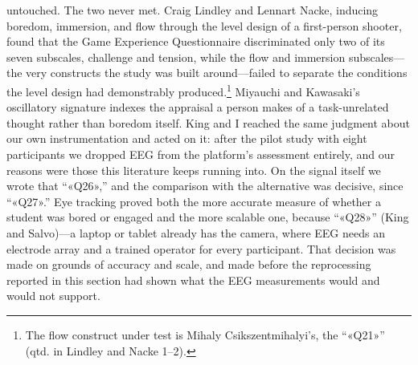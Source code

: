 untouched. The two never met. Craig Lindley and Lennart Nacke, inducing boredom,
immersion, and flow through the level design of a first-person shooter, found that the Game
Experience Questionnaire discriminated only two of its seven subscales, challenge and tension,
while the flow and immersion subscales---the very constructs the study was built
around---failed to separate the conditions the level design had demonstrably
produced.\footnote{The flow construct under test is Mihaly Csikszentmihalyi's, the ``«Q21»''
(qtd. in Lindley and Nacke 1--2).} Miyauchi and Kawasaki's oscillatory signature indexes the
appraisal a person makes of a task-unrelated thought rather than boredom itself. King and I
reached the same judgment about our own instrumentation and acted on it: after the pilot study
with eight participants we dropped EEG from the platform's assessment entirely, and our
reasons were those this literature keeps running into. On the signal itself we wrote that
``«Q26»,'' and the comparison with the alternative was decisive, since ``«Q27».'' Eye tracking
proved both the more accurate measure of whether a student was bored or engaged and the more
scalable one, because ``«Q28»'' (King and Salvo)---a laptop or tablet already has the camera,
where EEG needs an electrode array and a trained operator for every participant. That decision
was made on grounds of accuracy and scale, and made before the reprocessing reported in this
section had shown what the EEG measurements would and would not support.
